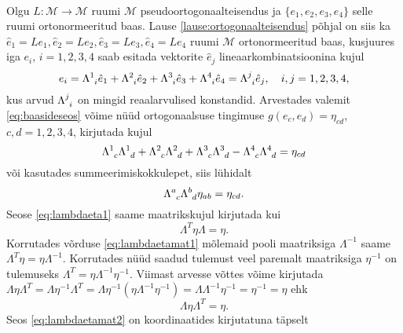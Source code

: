 \documentclass[a4paper,12pt]{article}
\theoremstyle{plain}
\theoremstyle{definition}
\numberwithin{equation}{section}
\def\M{{\mathcal M}}
\begin{document}
\paragraph{} Olgu $L : \M \rightarrow \M$ ruumi $\M$ pseudoortogonaalteisendus ja $\{e_1, e_2, e_3, e_4\}$ selle ruumi ortonormeeritud baas. Lause \ref{lause:ortogonaalteisendus} põhjal on siis ka $\hat{e}_1 = Le_1, \hat{e}_2  = Le_2, \hat{e}_3 = Le_3, \hat{e}_4 = Le_4$ ruumi $\M$ ortonormeeritud baas, kusjuures iga $e_i$, $i = 1,2,3,4$ saab esitada vektorite $\hat{e}_j$ lineaarkombinatsioonina kujul
\begin{equation} \label{eq:baasideseos}
e_i = \Lambda\indices{^1_i} \hat{e}_1 + \Lambda\indices{^2_i} \hat{e}_2 + \Lambda\indices{^3_i} \hat{e}_3 + \Lambda\indices{^4_i} \hat{e}_4 = \Lambda\indices{^j_i} \hat{e}_j, \quad i,j = 1, 2, 3, 4,
\end{equation}
kus arvud $\Lambda\indices{^j_i}$ on mingid reaalarvulised konstandid. Arvestades valemit \ref{eq:baasideseos} võime nüüd ortogonaalsuse tingimuse $g \left(e_c, e_d\right) = \eta_{cd}$, $c, d = 1, 2, 3, 4$, kirjutada kujul
\begin{equation*}
\Lambda\indices{^1_c} \Lambda\indices{^1_d} + \Lambda\indices{^2_c} \Lambda\indices{^2_d} + \Lambda\indices{^3_c} \Lambda\indices{^3_d} - \Lambda\indices{^4_c} \Lambda\indices{^4_d} = \eta_{cd}
\end{equation*}
või kasutades summeerimiskokkulepet, siis lühidalt
\begin{equation} \label{eq:lambdaeta1}
\Lambda\indices{^a_c} \Lambda\indices{^b_d} \eta_{ab} = \eta_{cd}.
\end{equation}
Seose \ref{eq:lambdaeta1} saame maatrikskujul kirjutada kui
\begin{equation} \label{eq:lambdaetamat1}
\Lambda^T \eta \Lambda = \eta.
\end{equation}
Korrutades võrduse \ref{eq:lambdaetamat1} mõlemaid pooli maatriksiga $\Lambda^{-1}$ saame $\Lambda^T \eta = \eta \Lambda^{-1}$. Korrutades nüüd saadud tulemust veel paremalt maatriksiga $\eta^{-1}$ on tulemuseks $\Lambda^T = \eta \Lambda^{-1} \eta^{-1}$. Viimast arvesse võttes võime kirjutada $\Lambda \eta \Lambda^T = \Lambda \eta^{-1} \Lambda^T = \Lambda \eta^{-1} \left( \eta \Lambda^{-1} \eta^{-1} \right) = \Lambda \Lambda^{-1} \eta^{-1} = \eta^{-1} = \eta$ ehk
\begin{equation} \label{eq:lambdaetamat2}
\Lambda \eta \Lambda^T = \eta.
\end{equation}
Seos \ref{eq:lambdaetamat2} on koordinaatides kirjutatuna täpselt
\end{document}
